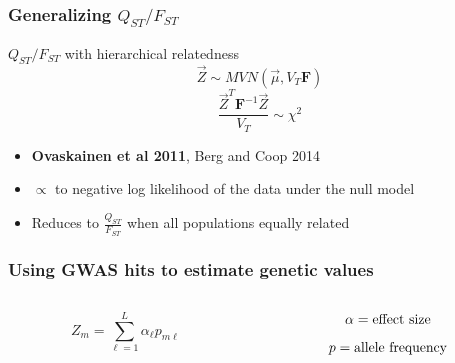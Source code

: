 \documentclass{beamer}
\begin{document}
\begin{frame}
\frametitle{Generalizing $Q_{ST}/F_{ST}$}
	\begin{block}{$Q_{ST}/F_{ST}$ with hierarchical relatedness}
		$$\vec{Z}\sim MVN\left(\vec{\mu},V_T\mathbf{F}\right)$$
		$$\frac{\vec{Z}^T\mathbf{F}^{-1}\vec{Z}}{V_T} \sim \chi^2$$
		\begin{itemize}
			\item \textbf{Ovaskainen et al 2011}, Berg and Coop 2014
			\item $\propto$ to negative log likelihood of the data under the null model
			\item Reduces to $\frac{Q_{ST}}{F_{ST}}$ when all populations equally related
		\end{itemize}
	\end{block}
\end{frame}


\begin{frame}[t]
	\frametitle{Using GWAS hits to estimate genetic values}
		\begin{columns}[T]
			\begin{column}{.48\textwidth}
				\begin{block}{}
					$$Z_m = \sum_{\ell=1}^L \alpha_{\ell}p_{m\ell}$$
				\end{block}
			\end{column}
			\begin{column}{.48\textwidth}
				\begin{block}{}
					$$\alpha = \textmd{effect size}$$
					$$p = \textmd{allele frequency}$$
				\end{block}
			\end{column}
		\end{columns}
\end{frame}
\end{document}
